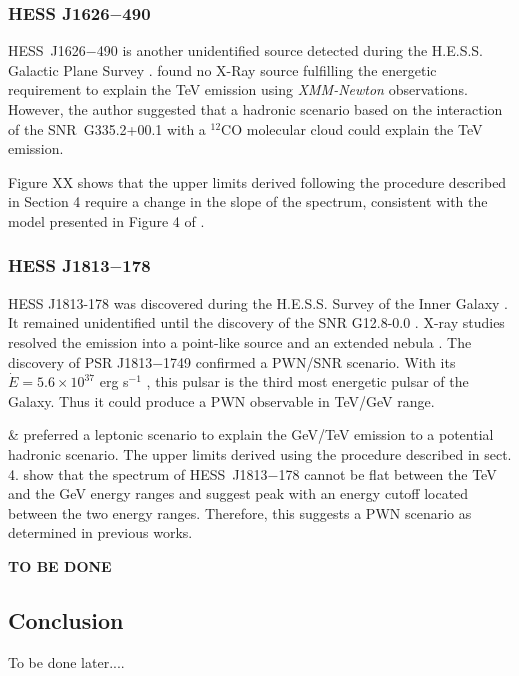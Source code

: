    
\subsubsection*{HESS J1626$-$490}

HESS~J1626$-$490 is another unidentified source detected during the H.E.S.S. Galactic Plane Survey \citep{2008AA...477..353A}. \cite{2011ICRC....7...44E} found no X-Ray source fulfilling the energetic requirement to explain the TeV emission using \emph{XMM-Newton} observations. However, the author suggested that a hadronic scenario based on the interaction of the SNR~G335.2+00.1 with a $^{12}$CO molecular cloud could explain the TeV emission.

Figure XX shows that the upper limits derived following the procedure described in Section 4 require a change in the slope of the spectrum, consistent with the model presented in Figure 4 of \cite{2011ICRC....7...44E}. 

\subsubsection*{HESS J1813$-$178}

HESS J1813-178 was discovered during the H.E.S.S. Survey of the Inner Galaxy \citep{2005Sci...307.1938A}. It remained unidentified until the discovery of the SNR G12.8-0.0 \cite{2005ApJ...629L.105B}. X-ray studies resolved the emission into a point-like source and an extended nebula \cite{2007AA...470..249F}. The discovery of PSR J1813$-$1749 \cite{2009ApJ...700L.158G} confirmed a PWN/SNR scenario. With its $\dot{E} = 5.6 \times 10^{37}$ erg s$^{-1}$ \citep{2012ApJ...753L..14H}, this pulsar is the third most energetic pulsar of the Galaxy. Thus it could produce a PWN observable in TeV/GeV range.

\cite{2007AA...470..249F} \& \cite{2010ApJ...718..467F} preferred a leptonic scenario to explain the GeV/TeV emission to a potential hadronic scenario. The upper limits derived using the procedure described in sect. 4. show that the spectrum of HESS~J1813$-$178 cannot be flat between the TeV and the GeV energy ranges and suggest peak with an energy cutoff located between the two energy ranges. Therefore, this suggests a PWN scenario as determined in previous works.

\textbf{TO BE DONE}


\subsection{Conclusion}
To be done later....